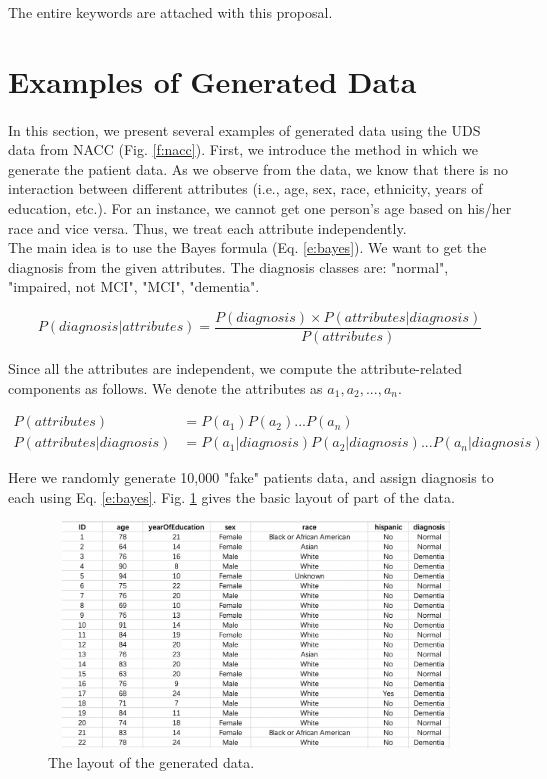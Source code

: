\documentclass{article}
\begin{document}
The entire keywords are attached with this proposal. \\

\section{Examples of Generated Data}
\paragraph{}
In this section, we present several examples of generated data using the UDS data from NACC (Fig. \ref{f:nacc}). First, we introduce the method in which we generate the patient data. As we observe from the data, we know that there is no interaction between different attributes (i.e., age, sex, race, ethnicity, years of education, etc.). For an instance, we cannot get one person's age based on his/her race and vice versa. Thus, we treat each attribute independently. \\

The main idea is to use the Bayes formula (Eq. \ref{e:bayes}). We want to get the diagnosis from the given attributes. The diagnosis classes are: "normal", "impaired, not MCI", "MCI", "dementia".

\begin{equation}
\label{e:bayes}
	P(diagnosis | attributes) = \frac{P(diagnosis) \times P(attributes | diagnosis)}{P(attributes)}
\end{equation}

Since all the attributes are independent, we compute the attribute-related components as follows. We denote the attributes as $a_1, a_2, ..., a_n$.

\begin{align}
	P(attributes) & = P(a_1) P(a_2) ... P(a_n) \\
	P(attributes | diagnosis) & = P(a_1 | diagnosis) P(a_2 | diagnosis) ... P(a_n | diagnosis)
\end{align}

Here we randomly generate 10,000 "fake" patients data, and assign diagnosis to each using Eq. \ref{e:bayes}. Fig. \ref{f:gen} gives the basic layout of part of the data.

\begin{figure}[!hbt]
\centering
\includegraphics[width=11cm, height=6cm]{figs/genData.png}
\caption{The layout of the generated data.}
\label{f:gen}
\end{figure}
\end{document}
